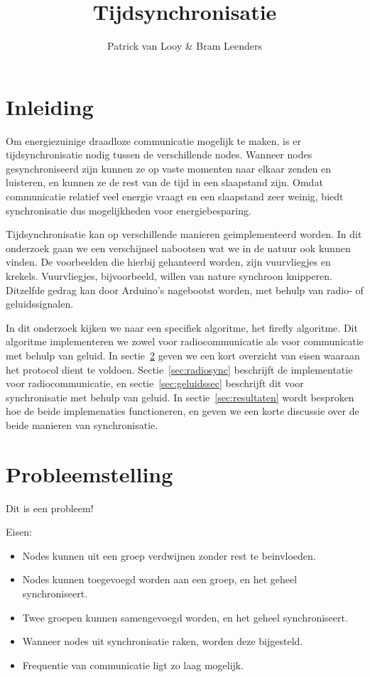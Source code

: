 \documentclass[a4paper,10pt]{article}
\title{Tijdsynchronisatie}
\author{Patrick van Looy \& Bram Leenders}
\begin{document}
\maketitle

\section{Inleiding}
Om energiezuinige draadloze communicatie mogelijk te maken, is er tijdsynchronisatie nodig tussen de verschillende nodes. Wanneer nodes gesynchroniseerd zijn kunnen ze op vaste momenten naar elkaar zenden en luisteren, en kunnen ze de rest van de tijd in een slaapstand zijn. Omdat communicatie relatief veel energie vraagt en een slaapstand zeer weinig, biedt synchronisatie dus mogelijkheden voor energiebesparing.

Tijdsynchronisatie kan op verschillende manieren geimplementeerd worden. In dit onderzoek gaan we een verschijnsel nabootsen wat we in de natuur ook kunnen vinden. De voorbeelden die hierbij gehanteerd worden, zijn vuurvliegjes en krekels. Vuurvliegjes, bijvoorbeeld, willen van nature synchroon knipperen\cite{buck1988synchronous}. Ditzelfde gedrag kan door Arduino's nagebootst worden, met behulp van radio- of geluidssignalen.

In dit onderzoek kijken we naar een specifiek algoritme, het firefly algoritme\cite{leidenfrost2009firefly, yang2013firefly}. Dit algoritme implementeren we zowel voor radiocommunicatie als voor communicatie met behulp van geluid. In sectie~\ref{sec:probleemstelling} geven we een kort overzicht van eisen waaraan het protocol dient te voldoen. Sectie~\ref{sec:radiosync} beschrijft de implementatie voor radiocommunicatie, en sectie~\ref{sec:geluidssec} beschrijft dit voor synchronisatie met behulp van geluid. In sectie~\ref{sec:resultaten} wordt besproken hoe de beide implemenaties functioneren, en geven we een korte discussie over de beide manieren van synchronisatie.

\section{Probleemstelling}\label{sec:probleemstelling}
Dit is een probleem!

Eisen:
\begin{itemize}
    \item Nodes kunnen uit een groep verdwijnen zonder rest te beinvloeden.
    \item Nodes kunnen toegevoegd worden aan een groep, en het geheel synchroniseert.
    \item Twee groepen kunnen samengevoegd worden, en het geheel synchroniseert.
    \item Wanneer nodes uit synchronisatie raken, worden deze bijgesteld.
    \item Frequentie van communicatie ligt zo laag mogelijk.
\end{itemize}
\end{document}
